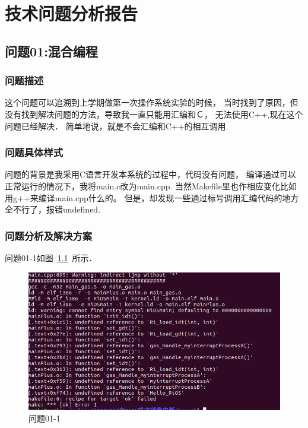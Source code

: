 \chapter{技术问题分析报告} 


\section{问题01:混合编程}

\subsection{问题描述}
这个问题可以追溯到上学期做第一次操作系统实验的时候，
当时找到了原因，但没有找到解决问题的方法，导致我一直只能用汇编和Ｃ，
无法使用C++,现在这个问题已经解决．
简单地说，就是不会汇编和C++的相互调用.


\subsection{问题具体样式}
问题的背景是我采用C语言开发本系统的过程中，代码没有问题，
编译通过可以正常运行的情况下，我将main.c改为main.cpp.
当然Makefile里也作相应变化比如用g++来编译main.cpp什么的。
但是，却发现一些通过标号调用汇编代码的地方全不行了，报错undefined.

\subsection{问题分析及解决方案}
问题01-1如图~\ref{problem01_1}~所示．	

\begin{figure}[!htbp]
		\centering	\includegraphics[width=14cm]{pic/assets/problems/problem01_1}
        \caption{问题01-1}	\label{problem01_1}	\end{figure}


